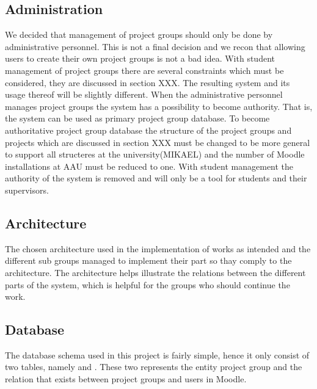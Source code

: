 \subsection{Administration}
We decided that management of project groups should only be done by administrative personnel. 
This is not a final decision and we recon that allowing users to create their own project groups is not a bad idea. 
With student management of project groups there are several constraints which must be considered, they are discussed in section XXX. 
The resulting system and its usage thereof will be slightly different. 
When the administrative personnel manages project groups the system has a possibility to become authority. 
That is, the system can be used as primary project group database. 
To become authoritative project group database the structure of the project groups and projects which are discussed in section XXX must be changed to be more general to support all structeres at the university(MIKAEL) and the number of Moodle installations at AAU must be reduced to one. 
With student management the authority of the system is removed and will only be a tool for students and their supervisors.




\subsection{Architecture}
The chosen architecture used in the implementation of \system{} works as intended and the different sub groups managed to implement their part so thay comply to the architecture. 
The architecture helps illustrate the relations between the different parts of the system, which is helpful for the groups who should continue the work. 




\subsection{Database}
The database schema used in this project is fairly simple, hence it only consist of two tables, namely   and . 
These two represents the entity project group and the relation that exists between project groups and users in Moodle. 

